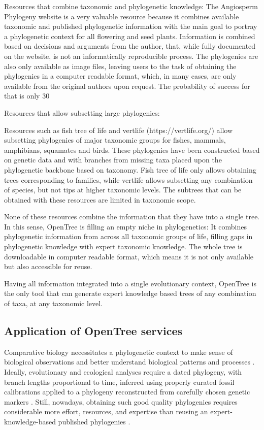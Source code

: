 \documentclass[oupdraft]{sysbio_sse}
\begin{document}
Resources that combine taxonomic and phylogenetic knowledge:
The Angiosperm Phylogeny website \citep{stevens2001angiosperm} is a very valuable resource because it combines
available taxonomic and published phylogenetic information with the main goal to
portray a phylogenetic context for all flowering and seed plants. Information is
combined based on decisions and arguments from the author, that, while fully documented
on the website, is not an informatically reproducible process. The phylogenies are
also only available as image files, leaving users to the task of obtaining the phylogenies
in a computer readable format, which, in many cases, are only available from the
original authors upon request. The probability of success for that is only 30%

Resources that allow subsetting large phylogenies:

Resources such as fish tree of life \citep{chang2019r} and vertlife (https://vertlife.org/)
allow subsetting phylogenies of major taxonomic groups for fishes, mammals, amphibians, squamates and birds.
These phylogenies have been constructed based on genetic data and with branches
from missing taxa placed upon the phylogenetic backbone based on taxonomy. Fish
tree of life only allows obtaining trees corresponding to families, while vertlife
allows subsetting any combination of species, but not tips at higher taxonomic levels.
The subtrees that can be obtained with these resources are limited in taxonomic scope.

None of these resources combine the information that they have into a single tree.
In this sense, OpenTree is filling an empty niche in phylogenetics:
It combines phylogenetic information from across all taxonomic groups of life,
filling gaps in phylogenetic knowledge with expert taxonomic knowledge. The whole
tree is downloadable in computer readable format, which means it is not only available
but also accessible for reuse.

Having all information integrated into a single evolutionary context, OpenTree
is the only tool that can generate expert knowledge based trees of any combination
of taxa, at any taxonomic level.


\subsection{Application of OpenTree services}

Comparative biology necessitates a phylogenetic context to make sense of biological
observations and better understand biological patterns and processes
\citep{felsenstein1985phylogenies, soltis2003role}.
Ideally, evolutionary and ecological analyses require a dated phylogeny, with branch lengths
proportional to time, inferred using properly curated fossil calibrations applied
to a phylogeny reconstructed from carefully chosen genetic markers \citep{webb2008phylocom, jantzen2019effects}.
Still, nowadays, obtaining such good quality phylogenies requires
considerable more effort, resources, and expertise than reusing an expert-knowledge-based
published phylogenies \citep{li2019common}.
\end{document}
